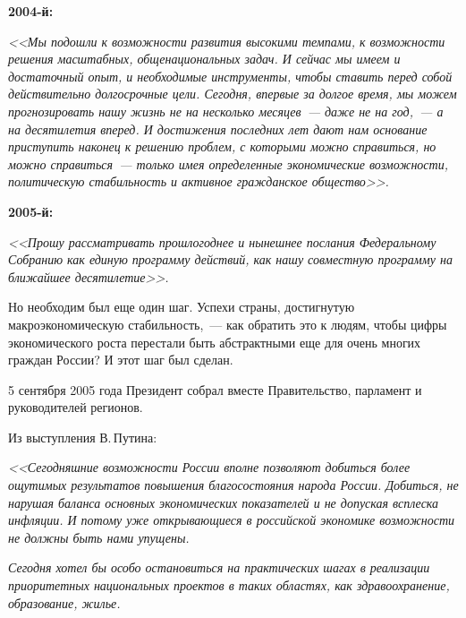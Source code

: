 \documentclass[article, 12pt, russian, oneside]{ncc}
\begin{document}

\textbf{2004-й:}

  \emph{<<Мы подошли к возможности развития высокими темпами, к
    возможности решения масштабных, общенациональных задач. И сейчас
    мы имеем и достаточный опыт, и необходимые инструменты, чтобы
    ставить перед собой действительно долгосрочные цели. Сегодня,
    впервые за долгое время, мы можем прогнозировать нашу жизнь не на
    несколько месяцев~--- даже не на год,~--- а на десятилетия
    вперед. И достижения последних лет дают нам основание приступить
    наконец к решению проблем, с которыми можно справиться, но можно
    справиться~--- только имея определенные экономические возможности,
    политическую стабильность и активное гражданское общество>>.}


\textbf{2005-й:}

  \emph{<<Прошу рассматривать прошлогоднее и нынешнее послания
    Федеральному Собранию как единую программу действий, как нашу
    совместную программу на ближайшее десятилетие>>.}


Но необходим был еще один шаг. Успехи страны, достигнутую
макроэкономическую стабильность,~--- как обратить это к людям, чтобы
цифры экономического роста перестали быть абстрактными еще для очень
многих граждан России? И этот шаг был сделан.

5 сентября 2005 года Президент собрал вместе Правительство, парламент
и руководителей регионов.

Из выступления В.\,Путина:

\emph{<<Сегодняшние возможности России вполне позволяют добиться более
  ощутимых результатов повышения благосостояния народа
  России. Добиться, не нарушая баланса основных экономических
  показателей и не допуская всплеска инфляции. И потому уже
  открывающиеся в российской экономике возможности не должны быть нами
  упущены.}
    
\emph{ Сегодня хотел бы особо остановиться на практических шагах в
  реализации приоритетных национальных проектов в таких областях, как
  здравоохранение, образование, жилье.}
\end{document}
